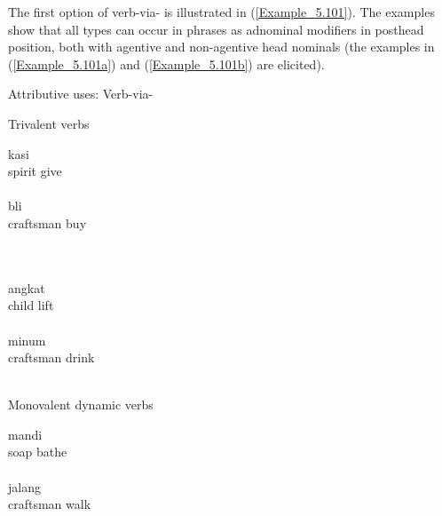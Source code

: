 The first option of verb-via-  is illustrated in (\ref{Example_5.101}). The examples show that all  types can occur in  phrases as adnominal modifiers in posthead position, both with agentive and non-agentive head nominals (the examples in (\ref{Example_5.101a}) and (\ref{Example_5.101b}) are elicited).


\begin{styleExampleTitle}
Attributive uses: Verb-via- 
\end{styleExampleTitle}



\ea
\label{Example_5.101}
 \hspace{0.5 cm} Trivalent verbs\\
\ea
\label{Example_5.101a}

 {kasi}\\
   spirit  give      \\
\\
\vspace{5pt}
\ex
\label{Example_5.101b}
 {bli}\\ %
craftsman  buy\\
\\

\vspace{10 pt}{Bivalent verbs}\vspace{0pt}\\
\ex
\label{Example_5.101c}

  {angkat}\\
   child  lift    \\
   \\
\vspace{5pt}
\ex
\label{Example_5.101d}
  {minum}\\
  craftsman  drink\\
\\


\newpage 

{Monovalent dynamic verbs}\vspace{0 pt}\\
\ex
\label{Example_5.101e}

  {mandi} \\
   soap  bathe      \\
   \\
\vspace{5pt}
\ex
\label{Example_5.101f}
  {jalang}\\
craftsman  walk\\
\\

